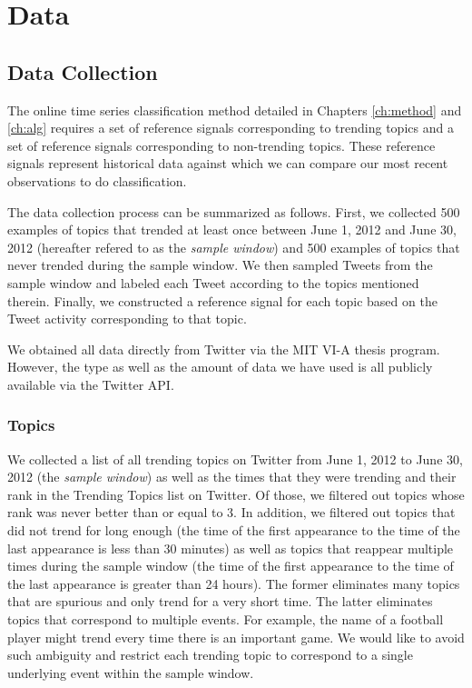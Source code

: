 \section{Data}
\subsection{Data Collection}
The online time series classification method detailed in Chapters
\ref{ch:method} and \ref{ch:alg} requires a set of reference signals
corresponding to trending topics and a set of reference signals corresponding to
non-trending topics. These reference signals represent historical data against
which we can compare our most recent observations to do classification.

The data collection process can be summarized as follows. First, we collected
500 examples of topics that trended at least once between June 1, 2012 and June
30, 2012 (hereafter refered to as the {\em sample window}) and 500 examples of
topics that never trended during the sample window. We then sampled Tweets from the
sample window and labeled each Tweet according to the topics mentioned
therein. Finally, we constructed a reference signal for each topic based on the
Tweet activity corresponding to that topic.

We obtained all data directly from Twitter via the MIT VI-A thesis
program. However, the type as well as the amount of data we have used is all
publicly available via the Twitter API.

\subsubsection{Topics}
We collected a list of all trending topics on Twitter from June 1, 2012 to June
30, 2012 (the {\em sample window}) as well as the times that they were trending
and their rank in the Trending Topics list on Twitter. Of those, we filtered out
topics whose rank was never better than or equal to 3. In addition, we filtered
out topics that did not trend for long enough (the time of the first appearance
to the time of the last appearance is less than 30 minutes) as well as topics
that reappear multiple times during the sample window (the time of the first
appearance to the time of the last appearance is greater than 24 hours). The
former eliminates many topics that are spurious and only trend for a very short
time. The latter eliminates topics that correspond to multiple events. For
example, the name of a football player might trend every time there is an
important game. We would like to avoid such ambiguity and restrict each trending
topic to correspond to a single underlying event within the sample window.

